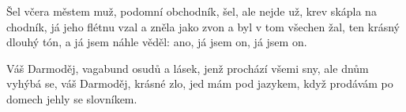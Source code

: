 \beginverse{}
\chordsoff{}
Šel včera městem muž, podomní obchodník, 
šel, ale nejde už, krev skápla na chodník,
já jeho flétnu vzal a zněla jako zvon 
a byl v tom všechen žal, ten krásný dlouhý tón,
a já jsem náhle věděl: ano, já jsem on, já jsem on.
\chordson{}
\endverse{}

\beginchorus{}
\chordsoff{}
Váš Darmoděj, vagabund osudů a lásek,
jenž prochází všemi sny, ale dnům vyhýbá se,
váš Darmoděj, krásné zlo, jed mám pod jazykem,
když prodávám po domech jehly se slovníkem.
\chordson{}
\endchorus{}

\endsong{}
